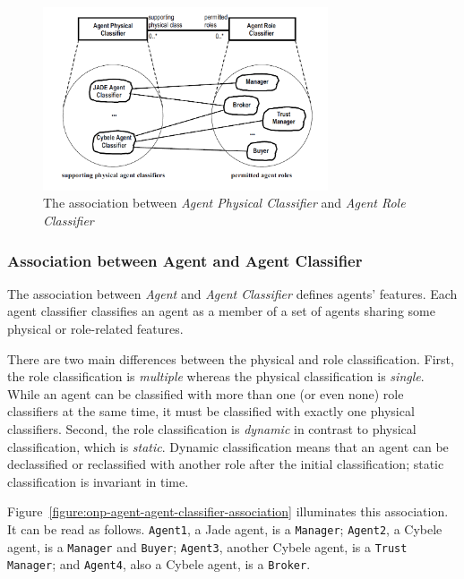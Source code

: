 \begin{figure}[ht]
	\centering
	\includegraphics[width=0.75\textwidth]{images/onp/physical-classifier-role-classifier-association.png}
	\caption{The association between \textit{Agent Physical Classifier} and \textit{Agent Role Classifier} \cite{Odell05}}
	\label{figure:onp-physical-classifier-role-classifier-association}
\end{figure}

\subsubsection*{Association between Agent and Agent Classifier}

The association between \textit{Agent} and \textit{Agent Classifier} defines agents' features.
Each agent classifier classifies an agent as a member of a set of agents sharing some physical or role-related features.

There are two main differences between the physical and role classification. First, the role classification is \textit{multiple} whereas the physical classification is \textit{single}.
While an agent can be classified with more than one (or even none) role classifiers at the same time, it must be classified with exactly one physical classifiers.
Second, the role classification is \textit{dynamic} in contrast to physical classification, which is \textit{static}.
Dynamic classification means that an agent can be declassified or reclassified with another role after the initial classification; static classification is invariant in time.

Figure~\ref{figure:onp-agent-agent-classifier-association} illuminates this association.
It can be read as follows. \texttt{Agent1}, a Jade agent, is a \texttt{Manager}; \texttt{Agent2}, a Cybele agent, is a \texttt{Manager} and \texttt{Buyer}; \texttt{Agent3}, another Cybele agent, is a \texttt{Trust Manager}; and \texttt{Agent4}, also a Cybele agent, is a \texttt{Broker}.


